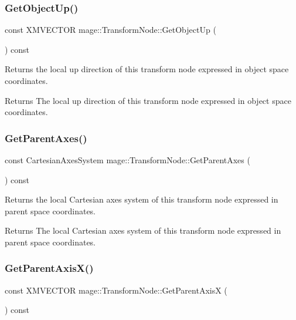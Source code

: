 \subsubsection{\texorpdfstring{Get\+Object\+Up()}{GetObjectUp()}}
{\footnotesize\ttfamily const X\+M\+V\+E\+C\+T\+OR mage\+::\+Transform\+Node\+::\+Get\+Object\+Up (\begin{DoxyParamCaption}{ }\end{DoxyParamCaption}) const}

Returns the local up direction of this transform node expressed in object space coordinates.

\begin{DoxyReturn}{Returns}
The local up direction of this transform node expressed in object space coordinates. 
\end{DoxyReturn}
\hypertarget{classmage_1_1_transform_node_aac33c894481ee82a5a0af2a4aeb2b9f8}{}\label{classmage_1_1_transform_node_aac33c894481ee82a5a0af2a4aeb2b9f8} 
\subsubsection{\texorpdfstring{Get\+Parent\+Axes()}{GetParentAxes()}}
{\footnotesize\ttfamily const Cartesian\+Axes\+System mage\+::\+Transform\+Node\+::\+Get\+Parent\+Axes (\begin{DoxyParamCaption}{ }\end{DoxyParamCaption}) const}

Returns the local Cartesian axes system of this transform node expressed in parent space coordinates.

\begin{DoxyReturn}{Returns}
The local Cartesian axes system of this transform node expressed in parent space coordinates. 
\end{DoxyReturn}
\hypertarget{classmage_1_1_transform_node_a64aae2ae63bc53791d3febed5a51f989}{}\label{classmage_1_1_transform_node_a64aae2ae63bc53791d3febed5a51f989} 
\subsubsection{\texorpdfstring{Get\+Parent\+Axis\+X()}{GetParentAxisX()}}
{\footnotesize\ttfamily const X\+M\+V\+E\+C\+T\+OR mage\+::\+Transform\+Node\+::\+Get\+Parent\+AxisX (\begin{DoxyParamCaption}{ }\end{DoxyParamCaption}) const}

